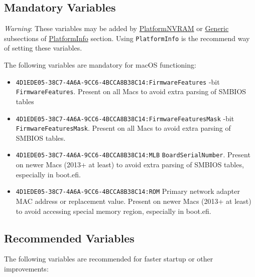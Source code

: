 \documentclass[]{article}
\makeatletter
\providecommand{\tightlist}{%
  \setlength{\itemsep}{0pt}\setlength{\parskip}{0pt}}
\renewcommand{\label}[1]{%
\zref@wrapper@immediate{\oldlabel{#1}}}  %
\makeatother
\begin{document}
\subsection{Mandatory Variables}\label{nvramvars}

\emph{Warning}: These variables may be added by
\hyperref[platforminfonvram]{PlatformNVRAM} or
\hyperref[platforminfogeneric]{Generic} subsections of
\hyperref[platforminfo]{PlatformInfo} section.
Using \texttt{PlatformInfo} is the recommend way of setting these variables.

The following variables are mandatory for macOS functioning:

\begin{itemize}
\tightlist
\item
  \texttt{4D1EDE05-38C7-4A6A-9CC6-4BCCA8B38C14:FirmwareFeatures}
  -bit \texttt{FirmwareFeatures}. Present on all Macs to avoid extra parsing of SMBIOS tables
\item
  \texttt{4D1EDE05-38C7-4A6A-9CC6-4BCCA8B38C14:FirmwareFeaturesMask}
  -bit \texttt{FirmwareFeaturesMask}. Present on all Macs to avoid extra parsing
  of SMBIOS tables.
\item
  \texttt{4D1EDE05-38C7-4A6A-9CC6-4BCCA8B38C14:MLB}
  \break
  \texttt{BoardSerialNumber}. Present on newer Macs (2013+ at least) to avoid extra parsing
  of SMBIOS tables, especially in boot.efi.
\item
  \texttt{4D1EDE05-38C7-4A6A-9CC6-4BCCA8B38C14:ROM}
  \break
  Primary network adapter MAC address or replacement value. Present on newer Macs
  (2013+ at least) to avoid accessing special memory region, especially in boot.efi.
\end{itemize}

\subsection{Recommended Variables}\label{nvramvarsrec}

The following variables are recommended for faster startup or other
improvements:
\end{document}

